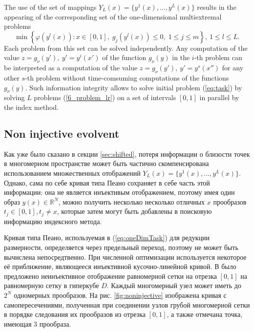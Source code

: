 \documentclass[runningheads]{llncs}
\begin{document}
The use of the set of mappings $Y_L(x)=\{y^1(x),...,y^L(x)\}$ results in the appearing of the corresponding set of the one-dimensional multiextremal problems
\begin{equation}\label{6_problem_lr}
  \min{\left\{\varphi(y^l(x)):x\in [0,1], \; g_j(y^l(x))\leq 0, \; 1 \leq j \leq m\right\}}, \ 1 \leq l \leq L.
\end{equation}
Each problem from this set can be solved independently. Any computation of the value $z=g_\nu(y'),\ y'=y^i(x')$ of the function $g_\nu(y)$ in the $i$-th problem can be interpreted as a computation of the value $z=g_\nu(y'),\ y'=y^s(x'')$ for any other $s$-th problem without time-comsuming computations of the functions $g_\nu(y)$. Such information integrity allows to solve  initial problem (\ref{eq:task}) by solving $L$ problems (\ref{6_problem_lr}) on a set of intervals $[0,1]$ in parallel by the index method.

\subsection{Non injective evolvent}

Как уже было сказано в секции \ref{sec:shifted}, потеря информации о близости точек в многомерном пространстве может быть частично скомпенсирована использованием множественных отображений $Y_L(x)=\{y^1(x),...,y^L(x)\}$. Однако, сама по себе кривая типа Пеано сохраняет в себе часть этой информации: она не является инъективым отображением, поэтому имея один образ $y(x)\in \mathbb{R}^N$, можно получить несколько несколько отличных $x$ прообразов $t_j\in[0,1], t_j \not = x$, которые затем могут быть добавлены в поисковую информацию индексного метода.

Кривая типа Пеано, используемая в (\ref{eq:oneDimTask}) для редукции размерности, определяется через предельный переход,
поэтому не может быть вычислена непосредтвенно. При численной оптимизации используется некоторое её приближение, являющееся
инъективной кусочно-линейной кривой. В \cite{strongin1978} было предложено неинъективное отображение равномерной сетки на отрезка $[0,1]$ на равномерную сетку в гиперкубе $D$. Каждый многомерный узел может иметь до $2^N$ одномерных прообразов. На рис. \ref{fig:noninjective} изображена кривая с самопересечениями, полученная при соединении узлов грубой многомерной сетки в порядке следования их прообразов из отрезка $[0,1]$, а также отмечана точка, имеющая 3 прообраза.

\end{document}
